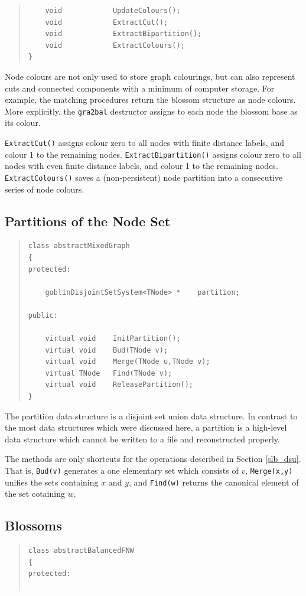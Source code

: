 \documentclass[a4paper,11pt,twoside]{book}
\begin{document}
\begin{multicols}{2}
\begin{quote}
\begin{verbatim}
    void            UpdateColours();
    void            ExtractCut();
    void            ExtractBipartition();
    void            ExtractColours();
}
\end{verbatim}
\end{quote}
Node colours are not only used to store graph colourings, but can also
represent cuts and connected components with a minimum of computer storage.
For example, the matching procedures return the blossom structure as node
colours. More explicitly, the \verb/gra2bal/ destructor assigns to each node
the blossom base as its colour.

\verb/ExtractCut()/ assigns colour zero to all nodes with finite distance labels,
and colour 1 to the remaining nodes. \verb/ExtractBipartition()/ assigns colour
zero to all nodes with even finite distance labels, and colour 1 to the
remaining nodes. \verb/ExtractColours()/ saves a (non-persistent) node
partition into a consecutive series of node colours.


\subsection{Partitions of the Node Set}
\label{slb_part}
\methods
\begin{quote}
\begin{verbatim}
class abstractMixedGraph
{
protected:

    goblinDisjointSetSystem<TNode> *    partition;

public:

    virtual void    InitPartition();
    virtual void    Bud(TNode v);
    virtual void    Merge(TNode u,TNode v);
    virtual TNode   Find(TNode v);
    virtual void    ReleasePartition();
}
\end{verbatim}
\end{quote}
The partition data structure is a disjoint set union data structure.
In contrast to the most data structures which were discussed here,
a partition is a high-level data structure which cannot be
written to a file and reconstructed properly.

The methods are only shortcuts for the operations described in Section
\ref{slb_dsu}. That is, \verb/Bud(v)/ generates a one elementary set which
consists of $v$, \verb/Merge(x,y)/ unifies the sets containing $x$ and $y$,
and \verb/Find(w)/ returns the canonical element of the set cotaining $w$.


\subsection{Blossoms}
\label{slb_blossom}
\methods
\begin{quote}
\begin{verbatim}
class abstractBalancedFNW
{
protected:


\end{verbatim}
\end{quote}
\end{multicols}
\end{document}
